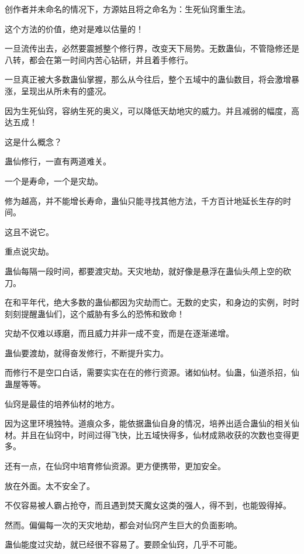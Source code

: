 
\begin{this_body}

创作者并未命名的情况下，方源姑且将之命名为：生死仙窍重生法。

这个方法的价值，绝对是难以估量的！

一旦流传出去，必然要震撼整个修行界，改变天下局势。无数蛊仙，不管隐修还是八转，都会在第一时间内苦心钻研，并且着手修行。

一旦真正被大多数蛊仙掌握，那么从今往后，整个五域中的蛊仙数目，将会激增暴涨，呈现出从所未有的盛况。

因为生死仙窍，容纳生死的奥义，可以降低天劫地灾的威力。并且减弱的幅度，高达五成！

这是什么概念？

蛊仙修行，一直有两道难关。

一个是寿命，一个是灾劫。

修为越高，并不能增长寿命，蛊仙只能寻找其他方法，千方百计地延长生存的时间。

这且不说它。

重点说灾劫。

蛊仙每隔一段时间，都要渡灾劫。天灾地劫，就好像是悬浮在蛊仙头颅上空的砍刀。

在和平年代，绝大多数的蛊仙都因为灾劫而亡。无数的史实，和身边的实例，时时刻刻提醒蛊仙们，这个威胁有多么的恐怖和致命！

灾劫不仅难以琢磨，而且威力并非一成不变，而是在逐渐递增。

蛊仙要渡劫，就得奋发修行，不断提升实力。

而修行不是空口白话，需要实实在在的修行资源。诸如仙材。仙蛊，仙道杀招，仙蛊屋等等。

仙窍是最佳的培养仙材的地方。

因为这里环境独特。道痕众多，能依据蛊仙自身的情况，培养出适合蛊仙的相关仙材。并且在仙窍中，时间过得飞快，比五域快得多，仙材成熟收获的次数也变得更多。

还有一点，在仙窍中培育修仙资源。更方便携带，更加安全。

放在外面。太不安全了。

不仅容易被人霸占抢夺，而且遇到焚天魔女这类的强人，得不到，也能毁得掉。

然而。偏偏每一次的天灾地劫，都会对仙窍产生巨大的负面影响。

蛊仙能度过灾劫，就已经很不容易了。要顾全仙窍，几乎不可能。


\end{this_body}

